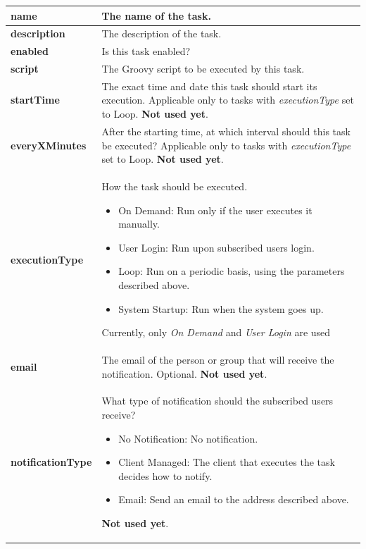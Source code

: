 \documentclass[a4paper]{article}
\begin{document}
		\begin{table}[h!]
			\centering
			\begin{tabular}{lp{10cm}}
				\textbf{name} & The name of the task. \\
				\midrule
				\textbf{description} & The description of the task. \\
				\midrule
				\textbf{enabled} & Is this task enabled? \\
				\midrule
				\textbf{script} & The Groovy script to be executed by this task.\\
				\midrule
				\textbf{startTime} & The exact time and date this task should start its execution. Applicable only to tasks with \textit{executionType} set to Loop. 
				\textbf{Not used yet}. \\
				\midrule
				\textbf{everyXMinutes} & After the starting time, at which interval should this task be executed? Applicable only to tasks with \textit{executionType} set to Loop. \textbf{Not used yet}.\\
				\textbf{executionType} & How the task should be executed.
					\begin{itemize}
						\item On Demand: Run only if the user executes it manually.
						\item User Login: Run upon subscribed users login.
						\item Loop: Run on a periodic basis, using the parameters described above.
						\item System Startup: Run when the system goes up.
					\end{itemize}
					Currently, only \textit{On Demand} and \textit{User Login} are used\\
				\midrule
				\textbf{email} & The email of the person or group that will receive the notification. Optional. \textbf{Not used yet}.\\
				\midrule
				\textbf{notificationType} & What type of notification should the subscribed users receive?
					\begin{itemize}
						\item No Notification: No notification.
						\item Client Managed: The client that executes the task decides how to notify.
						\item Email: Send an email to the address described above.
					\end{itemize}
					\textbf{Not used yet}.
			\end{tabular}
		\end{table}
		
\end{document}

